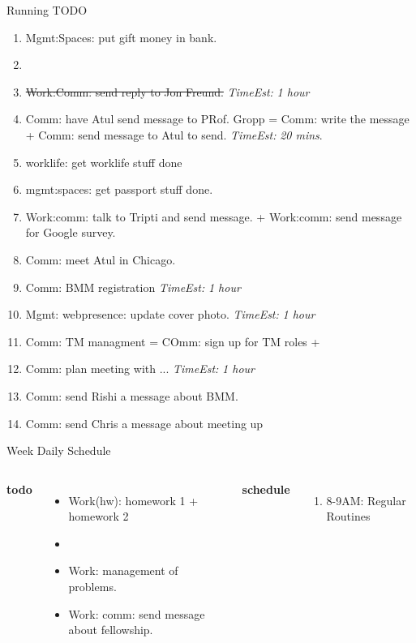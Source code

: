 \documentclass[serif, mathserif, final]{beamer}
\newcommand{\doneTask}[1]{\tiny \item \tiny \sout{#1}}
\newcommand{\te}[1]{\textit{TimeEst:} \textit{#1}}
\begin{document}
\begin{frame}{}
\begin{columns}
\begin{column}{0.50\linewidth}
\begin{block}{Running TODO}
\begin{enumerate}
    \item \small Mgmt:Spaces: put gift money in bank.  

    \item \small \doneTask{Work:Comm: send reply to Jon Freund.} \te{1 hour}

    \item \small Comm: have Atul send message to PRof. Gropp = Comm:
      write the message  + Comm: send message to Atul to send.  \te{20
        mins}.

    \item \small worklife: get worklife stuff done

    \item \small mgmt:spaces: get passport stuff done. 

    \item \small Work:comm: talk to Tripti and send message. +
      Work:comm: send message for Google survey. 

    \item \small Comm: meet Atul in Chicago. 
    \item \small Comm: BMM registration \te{1 hour} 
    \item \small Mgmt: webpresence: update cover photo. \te{1 hour} 

    \item \small  Comm: TM managment = COmm:  sign up for TM roles +

    \item \small  Comm: plan meeting with ...  \te{1 hour} 

    \item \tiny Comm: send Rishi a message about BMM.
    \item \tiny Comm: send Chris a message about meeting up 
    \end{enumerate}
  \end{block} 

  \begin{block}{Week Daily Schedule}
    \begin{columns} 
      \textbf{\small todo} \\ 
      \begin{itemize}
        \tiny \item \tiny Work(hw): homework 1  + homework 2 

        \tiny \item \tiny 
      \item \tiny Work: management of problems.
      \item \tiny Work: comm: send message about fellowship.
      \end{itemize} 
  \textbf{\small schedule} \\
  \begin{enumerate} 
    \tiny \item \tiny 8-9AM: Regular Routines 
  \end{enumerate} 


\end{columns}
\end{block}
\end{column}
\end{columns}
\end{frame}
\end{document}
